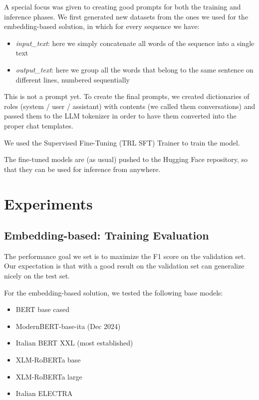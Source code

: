 \documentclass[11pt]{article}
\begin{document}
A special focus was given to creating good prompts for both the training and inference phases.
We first generated new datasets from the ones we used for the embedding-based solution, in which 
for every sequence we have:

 \begin{itemize}
 	\item \emph{input\_text}: here we simply concatenate all words of the sequence into a single text
 	\item \emph{output\_text}: here we group all the words that belong to the same sentence on different lines, numbered sequentially
 \end{itemize}
 
 This is not a prompt yet. To create the final prompts, we created dictionaries of roles (system / user / assistant) with contents (we called them conversations) and passed them to the LLM tokenizer in order to have them converted into the proper chat templates. 
 
 We used the Supervised Fine-Tuning (TRL SFT) Trainer to train the model.

The fine-tuned models are (as usual) pushed to the Hugging Face repository, so that they can be used for inference from anywhere.

\section{Experiments}

\subsection{Embedding-based: Training Evaluation}

The performance goal we set is to maximize the F1 score on the validation set. Our expectation is that with a good result on the
validation set can generalize nicely on the test set.

For the embedding-based solution, we tested the following base models:

 \begin{itemize}
 	\item BERT base cased
	\item ModernBERT-base-ita (Dec 2024)
	\item Italian BERT XXL (most established)
	\item XLM-RoBERTa base
	\item XLM-RoBERTa large
	\item Italian ELECTRA
\end{itemize}
\end{document}
